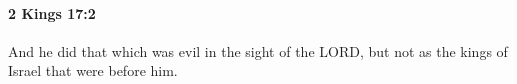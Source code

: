 
		\paragraph{2 Kings 17:2} %
			\label{2KINGS-17-2}

			And he did that which was evil in the sight of the LORD, but not as the kings of Israel that were before him.



